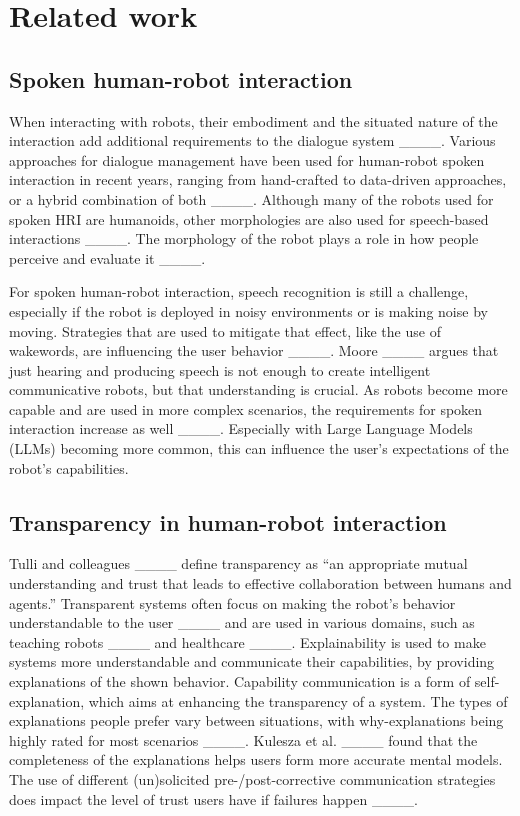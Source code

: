 \section{Related work}
\subsection{Spoken human-robot interaction}

When interacting with robots, their embodiment and the situated nature of the interaction add additional requirements to the dialogue system ____. Various approaches for dialogue management have been used for human-robot spoken interaction in recent years, ranging from hand-crafted to data-driven approaches, or a hybrid combination of both ____. Although many of the robots used for spoken HRI are humanoids, other morphologies are also used for speech-based interactions ____. %
The morphology of the robot plays a role in how people perceive and evaluate it ____.

For spoken human-robot interaction, speech recognition is still a challenge, especially if the robot is deployed in noisy environments or is making noise by moving. Strategies that are used to mitigate that effect, like the use of wakewords, are influencing the user behavior ____.
Moore ____ argues that just hearing and producing speech is not enough to create intelligent communicative robots, but that understanding is crucial.
As robots become more capable and are used in more complex scenarios, the requirements for spoken interaction increase as well ____. Especially with Large Language Models (LLMs) becoming more common, this can influence the user's expectations of the robot's capabilities.


\subsection{Transparency in human-robot interaction}

Tulli and colleagues ____ define transparency as ``an appropriate mutual understanding and trust that leads to effective collaboration between humans and agents.'' 
Transparent systems often focus on making the robot's behavior understandable to the user ____ and are used in various domains, such as teaching robots ____ and healthcare ____. Explainability is used to make systems more understandable and communicate their capabilities, by providing explanations of the shown behavior. Capability communication is a form of self-explanation, which aims at enhancing the transparency of a system.
The types of explanations people prefer vary between situations, with why-explanations being highly rated for most scenarios ____.
Kulesza et al. ____ found that the completeness of the explanations helps users form more accurate mental models.
The use of different (un)solicited pre-/post-corrective communication strategies does impact the level of trust users have if failures happen ____.

